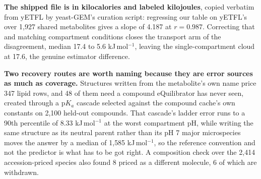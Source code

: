 \textbf{The shipped file is in kilocalories and labeled kilojoules}, copied verbatim from
yETFL by yeast-GEM's curation script: regressing our table on yETFL's over 1{,}927 shared
metabolites gives a slope of 4.187 at $r = 0.987$. Correcting that and matching compartment
conditions closes the transport arm of the disagreement, median 17.4 to 5.6 kJ\,mol$^{-1}$,
leaving the single-compartment cloud at 17.6, the genuine estimator difference.

\textbf{Two recovery routes are worth naming because they are error sources as much as
coverage.} Structures written from the metabolite's own name price 347 lipid rows, and 48 of
them need a compound eQuilibrator has never seen, created through a p$K_a$ cascade selected
against the compound cache's own constants on 2{,}100 held-out compounds. That cascade's
ladder error runs to a 90th percentile of 8.33 kJ\,mol$^{-1}$ at the worst compartment pH,
while writing the same structure as its neutral parent rather than its pH 7 major
microspecies moves the answer by a median of 1{,}585 kJ\,mol$^{-1}$, so the reference
convention and not the predictor is what has to be got right. A composition check over the
2{,}414 accession-priced species also found 8 priced as a different molecule, 6 of which are
withdrawn.

